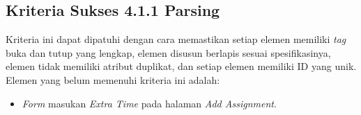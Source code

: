 \subsection{Kriteria Sukses 4.1.1 Parsing}
\label{subsec:peningkatan_A_4.1.1}

Kriteria ini dapat dipatuhi dengan cara memastikan setiap elemen memiliki \textit{tag} buka dan tutup yang lengkap, elemen disusun berlapis sesuai spesifikasinya, elemen tidak memiliki atribut duplikat, dan setiap elemen memiliki ID yang unik. Elemen yang belum memenuhi kriteria ini adalah:

\begin{itemize}
	\item \textit{Form} masukan \textit{Extra Time} pada halaman \textit{Add Assignment}.
\end{itemize}
